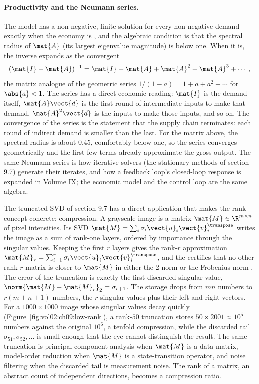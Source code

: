 \paragraph{Productivity and the Neumann series.}
The model has a non-negative, finite solution for every non-negative
demand exactly when the economy is , and the
algebraic condition is that the spectral radius of $\mat{A}$ (its
largest eigenvalue magnitude) is below one. When it is, the inverse
expands as the convergent 
\[
(\mat{I} - \mat{A})^{-1} = \mat{I} + \mat{A} + \mat{A}^{2} +
\mat{A}^{3} + \cdots,
\]
the matrix analogue of the geometric series $1/(1 - a) = 1 + a +
a^{2} + \cdots$ for $\abs{a} < 1$. The series has a direct economic
reading: $\mat{I}$ is the demand itself, $\mat{A}\vect{d}$ is the
first round of intermediate inputs to make that demand, $\mat{A}^{2}
\vect{d}$ is the inputs to make those inputs, and so on. The
convergence of the series is the statement that the supply chain
terminates: each round of indirect demand is smaller than the last.
For the matrix above, the spectral radius is about $0.45$, comfortably
below one, so the series converges geometrically and the first few
terms already approximate the gross output. The same Neumann series is
how iterative solvers (the stationary methods of section 9.7) generate
their iterates, and how a feedback loop's closed-loop response is
expanded in Volume IX; the economic model and the control loop are the
same algebra.

\begin{example}
The truncated SVD of section 9.7 has a direct application that makes
the rank concept concrete: compression. A grayscale image is a matrix
$\mat{M} \in \R^{m \times n}$ of pixel intensities. Its SVD $\mat{M}
= \sum_{i} \sigma_{i}\vect{u}_{i}\vect{v}_{i}^{\transpose}$ writes the
image as a sum of rank-one layers, ordered by importance through the
singular values. Keeping the first $r$ layers gives the rank-$r$
approximation $\mat{M}_{r} = \sum_{i=1}^{r} \sigma_{i}\vect{u}_{i}
\vect{v}_{i}^{\transpose}$, and the 
certifies that no other rank-$r$ matrix is closer to $\mat{M}$ in
either the 2-norm or the Frobenius norm
\cite{paper:v2ch10-eckart-young1936}. The error of the truncation is
exactly the first discarded singular value, $\norm{\mat{M} -
\mat{M}_{r}}_{2} = \sigma_{r+1}$. The storage drops from $mn$ numbers
to $r(m + n + 1)$ numbers, the $r$ singular values plus their left and
right vectors. For a $1000 \times 1000$ image whose singular values
decay quickly (Figure~\ref{fig:vol02:ch09:low-rank}), a rank-$50$
truncation stores $50 \times 2001 \approx 10^{5}$ numbers against the
original $10^{6}$, a tenfold compression, while the discarded tail
$\sigma_{51}, \sigma_{52}, \ldots$ is small enough that the eye cannot
distinguish the result. The same truncation is principal-component
analysis when $\mat{M}$ is a data matrix, model-order reduction when
$\mat{M}$ is a state-transition operator, and noise filtering when the
discarded tail is measurement noise. The rank of a matrix, an abstract
count of independent directions, becomes a compression ratio.
\end{example}

